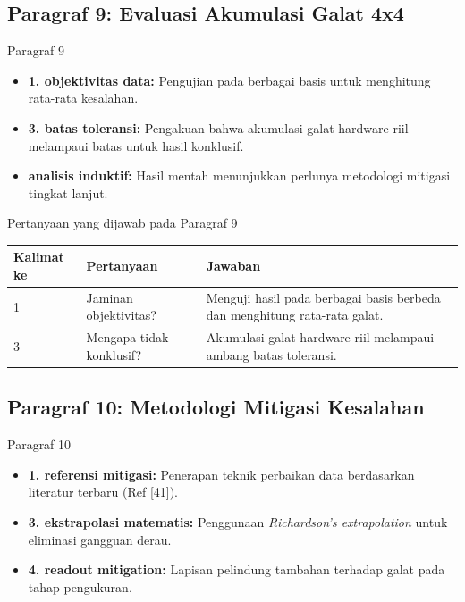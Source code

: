 \subsection{Paragraf 9: Evaluasi Akumulasi Galat 4x4}
\begin{frame}{Paragraf 9}
    \begin{itemize}
        \item \textbf{1. objektivitas data:} Pengujian pada berbagai basis untuk menghitung rata-rata kesalahan.
        \item \textbf{3. batas toleransi:} Pengakuan bahwa akumulasi galat hardware riil melampaui batas untuk hasil konklusif.
        \item \textbf{analisis induktif:} Hasil mentah menunjukkan perlunya metodologi mitigasi tingkat lanjut.
    \end{itemize}
\end{frame}

\begin{frame}{Pertanyaan yang dijawab pada Paragraf 9}
    \centering
    \small
    \begin{tabular}{lp{4.5cm}p{6cm}}
        \toprule
        Kalimat ke & Pertanyaan & Jawaban \\
        \midrule
        1 & Jaminan objektivitas? & Menguji hasil pada berbagai basis berbeda dan menghitung rata-rata galat. \\
        3 & Mengapa tidak konklusif? & Akumulasi galat hardware riil melampaui ambang batas toleransi. \\
        \bottomrule
    \end{tabular}
\end{frame}

\subsection{Paragraf 10: Metodologi Mitigasi Kesalahan}
\begin{frame}{Paragraf 10}
    \begin{itemize}
        \item \textbf{1. referensi mitigasi:} Penerapan teknik perbaikan data berdasarkan literatur terbaru (Ref [41]).
        \item \textbf{3. ekstrapolasi matematis:} Penggunaan \textit{Richardson's extrapolation} untuk eliminasi gangguan derau.
        \item \textbf{4. readout mitigation:} Lapisan pelindung tambahan terhadap galat pada tahap pengukuran.
    \end{itemize}
\end{frame}

